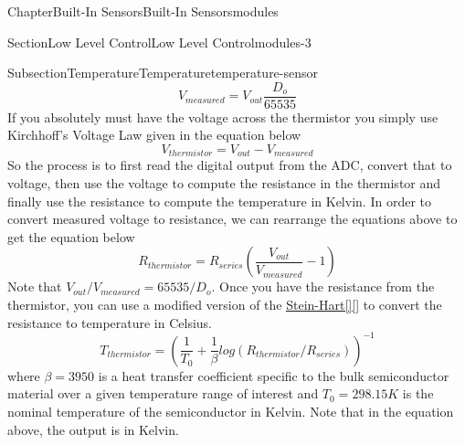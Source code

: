 \documentclass[oneside,10pt,]{book}
\newcommand{\xreffont}{\relax}
\newcommand{\linkhilite}[1]{\underline{#1}}
\numberwithin{equation}{section}
\begin{document}
\begin{chapterptx}{Chapter}{Built-In Sensors}{}{Built-In Sensors}{}{}{modules}
\begin{sectionptx}{Section}{Low Level Control}{}{Low Level Control}{}{}{modules-3}
\begin{subsectionptx}{Subsection}{Temperature}{}{Temperature}{}{}{temperature-sensor}
\begin{equation}
V_{measured} = V_{out}\frac{D_o}{65535}\label{temperature-sensor-4-4}
\end{equation}
If you absolutely must have the voltage across the thermistor you simply use Kirchhoff's Voltage Law given in the equation below%
\begin{equation}
V_{thermistor} = V_{out}-V_{measured}\label{temperature-sensor-4-5}
\end{equation}
So the process is to first read the digital output from the ADC, convert that to voltage, then use the voltage to compute the resistance in the thermistor and finally use the resistance to compute the temperature in Kelvin. In order to convert measured voltage to resistance, we can rearrange the equations above to get the equation below%
\begin{equation}
R_{thermistor} = R_{series}\left(\frac{V_{out}}{V_{measured}}-1\right)\label{temperature-sensor-4-6}
\end{equation}
Note that \(V_{out}/V_{measured}=65535/D_o\). Once you have the resistance from the thermistor, you can use a modified version of the \href{https://en.wikipedia.org/wiki/Steinhart}{\linkhilite{Stein-Hart}}\hyperlink{stein-hart}{\linkhilite{[{\xreffont 64}]}}\hyperlink{steinhart-wikipedia}{\linkhilite{[{\xreffont 65}]}} to convert the resistance to temperature in Celsius.%
%
\begin{equation}
T_{thermistor}=\left(\frac{1}{T_0}+\frac{1}{\beta}log(R_{thermistor}/R_{series})\right)^{-1}\label{temperature-sensor-5}
\end{equation}
where \(\beta=3950\) is a heat transfer coefficient specific to the bulk semiconductor material over a given temperature range of interest and \(T_0=298.15K\) is the nominal temperature of the semiconductor in Kelvin. Note that in the equation above, the output is in Kelvin.%
\par

\end{subsectionptx}
\end{sectionptx}
\end{chapterptx}
\end{document}
